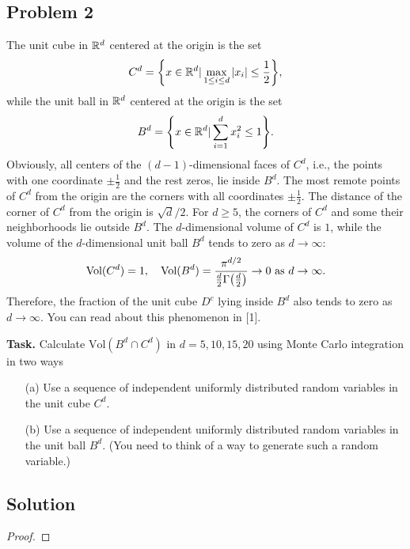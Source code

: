 \documentclass[12pt]{report}
\begin{document}


\begin{problem}%
\subsection*{Problem 2}

The unit cube in ${\mathbb R}^d$ centered at the origin is the set
\begin{equation*}
    C^d = {\left\{x \in {\mathbb R}^d | \max_{1 \leq i \leq d} |x_i| \leq \frac{1}{2}\right\}},
\end{equation*}
while the unit ball in ${\mathbb R}^d$ centered at the origin is the set
\begin{equation*}
    B^d = {\left\{x \in {\mathbb R}^d | \sum_{i=1}^d x_i^2 \leq 1\right\}}.
\end{equation*}
Obviously, all centers of the $(d-1)$-dimensional faces of $C^d$, i.e., the points with one coordinate $\pm \frac{1}{2}$ and the rest zeros, lie inside $B^d$. The most remote points of $C^d$ from the origin are the corners with all coordinates $\pm \frac{1}{2}$. The distance of the corner of $C^d$ from the origin is $\sqrt{d}/2$. For $d \geq 5$, the corners of $C^d$ and some their neighborhoods lie outside $B^d$. The $d$-dimensional volume of $C^d$ is $1$, while the volume of the $d$-dimensional unit ball $B^d$ tends to zero as $d \to \infty$:
\begin{equation*}
    \text{Vol}(C^d) = 1, \quad \text{Vol}(B^d) = \frac{\pi^{d/2}}{\frac{d}{2}\Gamma{\left(\frac{d}{2}\right)}} \to 0 ~\text{as}~ d\to \infty.
\end{equation*}
Therefore, the fraction of the unit cube $D^c$ lying inside $B^d$ also tends to zero as $d \to \infty$. You can read about this phenomenon in [1].

\noindent
\textbf{Task.} Calculate $\text{Vol}(B^d \cap C^d)$ in $d = 5,10,15,20$ using Monte Carlo integration in two ways
\begin{enumerate}
    \item [(a)] Use a sequence of independent uniformly distributed random variables in the unit cube $C^d$.
    \item [(b)] Use a sequence of independent uniformly distributed random variables in the unit ball $B^d$. (You need to think of a way to generate such a random variable.)
\end{enumerate}

\subsection*{Solution}
\begin{proof}


\end{proof}
\end{problem}
\end{document}
